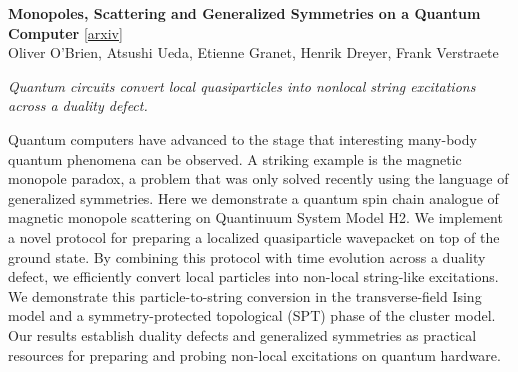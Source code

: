 \documentclass[12pt,letterpaper]{article}
\begin{document}
\medskip
{\small\textbf{Monopoles, Scattering and Generalized Symmetries on a Quantum Computer}} {\scriptsize[\href{https://arxiv.org/abs/2611.07960}{arxiv}]}\nopagebreak\\
{\scriptsize Oliver O'Brien, Atsushi Ueda, Etienne Granet, Henrik Dreyer, Frank Verstraete}\nopagebreak\\[2pt]
{\footnotesize\textit{Quantum circuits convert local quasiparticles into nonlocal string excitations across a duality defect.}\par}\nopagebreak
{\footnotesize Quantum computers have advanced to the stage that interesting many-body quantum phenomena can be observed. A striking example is the magnetic monopole paradox, a problem that was only solved recently using the language of generalized symmetries. Here we demonstrate a quantum spin chain analogue of magnetic monopole scattering on Quantinuum System Model H2. We implement a novel protocol for preparing a localized quasiparticle wavepacket on top of the ground state. By combining this protocol with time evolution across a duality defect, we efficiently convert local particles into non-local string-like excitations. We demonstrate this particle-to-string conversion in the transverse-field Ising model and a symmetry-protected topological (SPT) phase of the cluster model. Our results establish duality defects and generalized symmetries as practical resources for preparing and probing non-local excitations on quantum hardware.\par}
\medskip
\end{document}
